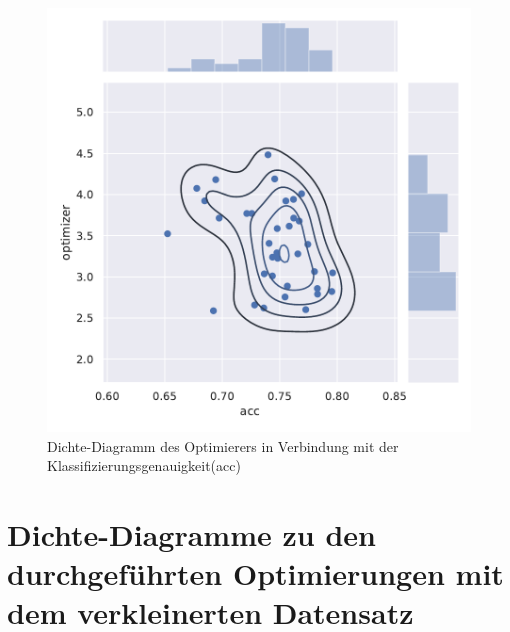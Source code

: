 \begin{figure}[H]
  \centering  
  \includegraphics[scale=0.5]{anhang/GA_250_cifar10_False_big_jointplot_optimizer.pdf}
  \caption{Dichte-Diagramm des Optimierers in Verbindung mit der Klassifizierungsgenauigkeit(acc)}

\end{figure}



\section{Dichte-Diagramme zu den durchgeführten Optimierungen mit dem verkleinerten Datensatz}

